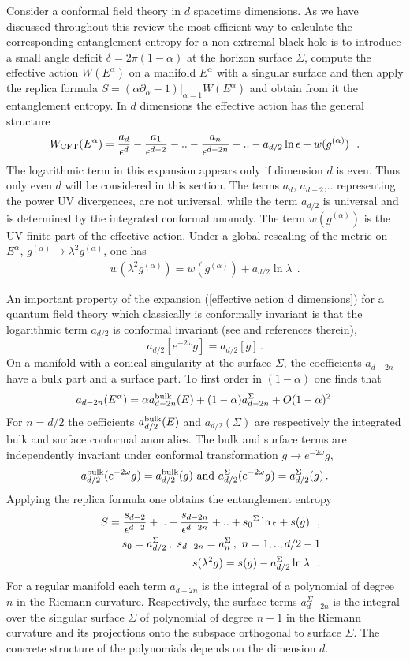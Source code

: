 \documentclass[12pt]{article}
\def\be{\begin{eqnarray}}
\def\ee{\end{eqnarray}}
\def\lb{\label}
\def\o{\over}
\begin{document}
Consider a conformal field theory in $d$ spacetime dimensions. As we have discussed throughout this review the most efficient way to calculate the corresponding
entanglement entropy for a non-extremal black hole is to introduce a small angle deficit $\delta=2\pi
(1-\alpha)$ at the horizon surface $\Sigma$, compute the effective action $W(E^\alpha)$ on a
manifold $E^\alpha$ with a singular surface and then apply the
replica formula $S=(\alpha\partial_\alpha-1)|_{\alpha=1}W(E^\alpha)$ and obtain from it the entanglement entropy.
In $d$ dimensions the effective action 
has the general structure 
\be W_{\rm CFT}(E^\alpha)={a_d\over
\epsilon^d}-{a_{1}\over \epsilon^{d-2}}-..-{a_{n}\o \epsilon^{d-2n}}-..-a_{d/2}\ln \epsilon
+w(g^{(\alpha)})~~. \lb{effective action d dimensions} \ee 
The logarithmic term in this expansion appears only if dimension $d$ is even. Thus only even $d$ will be considered in this section.
The terms $a_d$, $a_{d-2}$,..
representing the power UV divergences, are not  universal,
while the term $a_{d/2}$ is universal and is determined by the
integrated conformal anomaly.  The term $w(g^{(\alpha)})$ is the UV finite
part of the effective action. Under a global rescaling of the 
metric on $E^\alpha$, $g^{(\alpha)}\rightarrow \lambda^2
g^{(\alpha)}$, one has \be
w(\lambda^2g^{(\alpha)})=w(g^{(\alpha)})+a_{d/2}\ln \lambda~~.
\lb{action transform} \ee 

An important property of the expansion  (\ref{effective action d dimensions}) for a quantum field theory which classically is conformally invariant  is that
the logarithmic term $a_{d/2}$ is conformal invariant  (see \cite{Vassilevich:2003xt} and references therein),
$$a_{d/2}[e^{-2\omega}g]=a_{d/2}[g]\, .
$$ 
On a manifold with a conical singularity at the surface $\Sigma$, the coefficients
$a_{d-2n}$ have  a bulk part and a surface part. To
first order in $(1-\alpha)$ one finds that \be
a_{d-2n}(E^\alpha)=\alpha a^{\rm bulk}
_{d-2n}(E)+(1-\alpha)a_{d-2n}^\Sigma +O(1-\alpha)^2\, \lb{decomposition an}
\ee
 For $n=d/2$ the oefficients $a_{d/2}^{\rm
bulk} (E)$ and $a_{d/2}(\Sigma)$ are respectively the integrated bulk
and surface conformal anomalies. The bulk and surface terms are independently invariant under conformal transformation
$g\rightarrow e^{-2\omega}g$, \be a_{d/2}^{\rm
bulk}(e^{-2\omega}g)=a_{d/2}^{\rm bulk}(g) \ {\rm and}  \
a_{d/2}^\Sigma(e^{-2\omega}g)=a_{d/2}^\Sigma (g)\, . \lb{singular conf transform} \ee 
Applying
the replica formula one obtains the entanglement entropy 
\be
&&S={s_{d-2}\over \epsilon^{d-2}}+..+{s_{d-2n}\o \epsilon^{d-2n}}+..+{s_0}^\Sigma \ln \epsilon+s(g)~~,
\nonumber \\
&&s_0=a^\Sigma_{d/2}\, , \ s_{d-2n}=a^\Sigma_{n}\, , \ n=1, .. ,d/2-1 \nonumber \\ 
&&s(\lambda^2 g)=s(g)-a_{d/2}^\Sigma\ln\lambda~~. \lb{entropy general structure} \ee
For a regular manifold each term $a_{d-2n}$ is the integral of a polynomial of degree $n$ in the Riemann curvature.  
Respectively, the surface terms $a^\Sigma_{d-2n} $ is the integral over the singular surface $\Sigma$ of polynomial of degree $n-1$ in the Riemann curvature and its
projections onto the subspace orthogonal to surface $\Sigma$.
The concrete structure of the polynomials depends on the dimension $d$.
\end{document}
